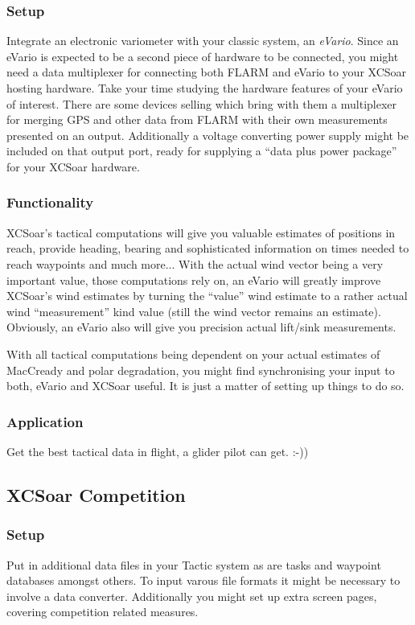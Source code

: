 \subsubsection*{Setup} Integrate an electronic variometer with your classic 
system, an \emph{eVario}. Since an eVario is expected to be a second piece of
hardware to be connected, you might need a data multiplexer for connecting both
FLARM and eVario to your XCSoar hosting hardware. Take your time studying the
hardware features of your eVario of interest. There are some devices selling
which bring with them a multiplexer for merging GPS and other data from FLARM with
their own measurements presented on an output. Additionally a voltage converting 
power supply might be included on that output port, ready for supplying a ``data
plus power package'' for your XCSoar hardware.

\subsubsection*{Functionality} XCSoar's tactical computations will give you 
valuable estimates of positions in reach, provide heading, bearing and 
sophisticated information on times needed to reach waypoints and much more... 
With the actual wind vector being a very important value, those computations rely 
on, an eVario will greatly improve XCSoar's wind estimates by turning the ``value''
wind estimate to a rather actual wind ``measurement'' kind value (still the wind 
vector remains an estimate). Obviously, an eVario also will give you precision 
actual lift/sink measurements.

With all tactical computations being dependent on your actual estimates of 
MacCready and polar degradation, you might find synchronising your input to both, 
eVario and XCSoar useful. It is just a matter of setting up things to do so.

\subsubsection*{Application} Get the best tactical data in flight, a glider pilot 
can get. :-))

\subsection*{XCSoar Competition}
\subsubsection*{Setup} Put in additional data files in your Tactic system as are 
tasks and waypoint databases amongst others. To input varous file formats it 
might be necessary to involve a data converter. Additionally you might set up 
extra screen pages, covering competition related measures.


